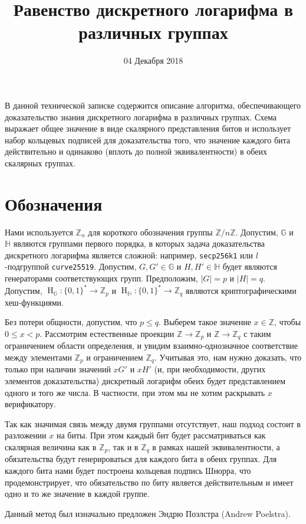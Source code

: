 \documentclass{mrl}
\title{Равенство дискретного логарифма в различных группах}
\date{04 Декабря 2018}
\newcommand{\hg}{\operatorname{H}_\mathbb{G}}
\newcommand{\hh}{\operatorname{H}_\mathbb{H}}
\newcommand{\zp}{\mathbb{Z}_p}
\newcommand{\zq}{\mathbb{Z}_q}
\begin{document}
\begin{center}
{}
\end{center}

В данной технической записке содержится описание алгоритма, обеспечивающего доказательство знания дискретного логарифма в различных группах. Схема выражает общее значение в виде скалярного представления битов и использует набор кольцевых подписей для доказательства того, что значение каждого бита действительно и одинаково (вплоть до полной эквивалентности) в обеих скалярных группах.

\section{Обозначения}
Нами используется $\mathbb{Z}_n$ для короткого обозначения группы $\mathbb{Z}/n\mathbb{Z}$. Допустим, $\mathbb{G}$ и $\mathbb{H}$ являются группами первого порядка, в которых задача доказательства дискретного логарифма является \newline сложной: например, \texttt{secp256k1} или $l$-подгруппой \texttt{curve25519}. Допустим, $G,G' \in \mathbb{G}$ и $H,H' \in \mathbb{H}$ будет являются генераторами соответствующих групп. Предположим, $|G| = p$ и $|H| = q$. Допустим, $\hg: \{0,1\}^* \to \zp$ и $\hh: \{0,1\}^* \to \zq$ являются криптографическими хеш-функциями.

Без потери общности, допустим, что $p \leq q$. Выберем такое значение $x \in \mathbb{Z}$, чтобы $0 \leq x < p$. Рассмотрим естественные проекции $\mathbb{Z} \to \zp$ и $\mathbb{Z} \to \zq$ с таким ограничением области определения, и увидим взаимно-однозначное соответствие между элементами $\zp$ и ограничением $\zq$. Учитывая это, нам нужно доказать, что только при наличии значений $xG'$ и $xH'$ (и, при необходимости, других элементов доказательства) дискретный логарифм обеих будет представлением одного и того же числа. В частности, при этом мы не хотим раскрывать $x$ верификатору.

Так как значимая связь между двумя группами отсутствует, наш подход состоит в разложении $x$ на биты. При этом каждый бит будет рассматриваться как скалярная величина как в $\zp$, так и в $\zq$ в рамках нашей эквивалентности, а обязательства будут генерироваться для каждого бита в обеих группах. Для каждого бита нами будет построена кольцевая подпись Шнорра, что продемонстрирует, что обязательство по биту является действительным и имеет одно и то же значение в каждой группе.

Данный метод был изначально предложен Эндрю Поэлстра (Andrew Poelstra).
\end{document}
